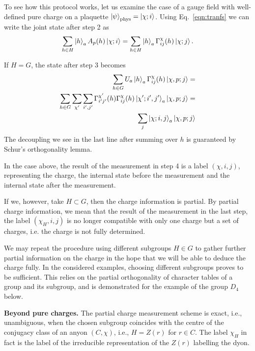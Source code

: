 \documentclass[two column]{article}
\begin{document}
To see how this protocol works, let us examine the case of a  gauge field with well-defined pure charge on a plaquette  $\ket{\psi}_\text{phys} = \ket{\chi; i}$. Using  Eq.~\eqref{eqn:tranfs} we can write the joint state after step 2 as
\begin{equation}
    \sum_{h \in H} \ket{h}_a A_p{(h)} \ket{\chi; i} = \sum_{h \in H} \ket{h}_a \Gamma^{\chi}_{ij}(h) \ket{\chi; j}.
\end{equation}

If $H = G$, the state after step 3 becomes\begin{equation}
    \begin{split}
        \sum_{h \in G} U_a\ket{h}_a \Gamma^{\chi}_{ij}(h) \ket{\chi, p; j} = \\
        \sum_{h \in G} \sum_{\chi'}\sum_{i', j'}  \Gamma^{\chi'}_{i'j'}(h)\Gamma^{\chi}_{ij}(h) \ket{\chi'; i', j'}_a \ket{\chi, p; j} =\\
        \sum_j\ket{\chi; i, j}_a \ket{\chi, p; j}
    \end{split}
\end{equation}
The decoupling we see in the last line after summing over $h$ is guaranteed by Schur's orthogonality lemma.

In the case above, the result of the measurement in step 4 is a label $(\chi, i, j)$, representing the charge, the internal state before the measurement and the internal state after the measurement.

If we, however, take $H \subset G$, then the charge information is partial.
By partial charge information, we mean that the result of the measurement in the last step, the label $(\chi_H, i, j)$ is no longer compatible with only one charge but a set of charges, i.e. the charge is not fully determined.

We may repeat the procedure using different subgroups $H \in G$ to gather further partial information on the charge in the hope that we will be able to deduce the charge fully. In the considered examples, choosing different subgroups proves to be sufficient. This relies on the partial orthogonality of character tables of a group and its subgroup, and is demonstrated for the example of the group $D_4$ below.

\textbf{Beyond pure charges.} The partial charge measurement scheme is exact, i.e., unambiguous, when the chosen subgroup coincides with the centre of the conjugacy class of an anyon $(C, \chi)$, i.e., $H = Z(r)$ for $r \in C$.
The label $\chi_H$ in fact is the label of the irreducible representation of the $Z(r)$ labelling the dyon.
\end{document}
